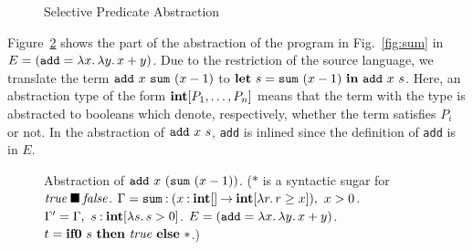 \begin{figure}[t]
\begin{minipage}{\textwidth}
 {}

\medskip

 {}

%

%
\end{minipage}
\caption{Selective Predicate Abstraction}
\label{fig:abstraction}
\end{figure}

Figure~\ref{fig:abst-example} shows the part of the abstraction of the
program in Fig.~\ref{fig:sum} in $E =
(\mathtt{add}=\lambda{x}.\,{\lambda{y}.\,{x+y}})$.  Due to the restriction of the
source language, we translate the term
${{\mathtt{add}}~{x}}~{{\mathtt{sum}}~{(x-1)}}$ to
$\mathbf{let}\ {s} = {{\mathtt{sum}}~{(x-1)}}\ \mathbf{in}\ {{{\mathtt{add}}~{x}}~{s}}$.
Here, an abstraction type of the form $\mathbf{int}[P_1,\dots,P_n]$ means that
the term with the type is abstracted to booleans which
denote, respectively, whether the term satisfies $P_i$ or not.
In the abstraction of ${{\mathtt{add}}~{x}}~{s}$,
\texttt{add} is inlined since the definition of \texttt{add} is in $E$.

\begin{figure}[t]

\caption{Abstraction of ${{\mathtt{add}}~{x}}~{({\mathtt{sum}}~{(x-1)})}$.
 ($*$ is a syntactic sugar for ${\mathit{true}}\mathbin{\blacksquare}{\mathit{false}}$.
  $\Gamma = \mathtt{sum}\mathbin{:}({x\mathbin{:}\mathbf{int}[]}\mathbin{\rightarrow}{\mathbf{int}[\lambda{r}.\,{r \geq x}]}),~ x>0$.
  $\Gamma' = \Gamma,~s\mathbin{:}\mathbf{int}[\lambda{s}.\,{s>0}]$.
  $E = (\mathtt{add}=\lambda{x}.\,{\lambda{y}.\,{x+y}})$.
  $t = \mathbf{if0}~{s}~\mathbf{then}~{\mathit{true}}~\mathbf{else}~{*}$.)}
\label{fig:abst-example}
\end{figure}

